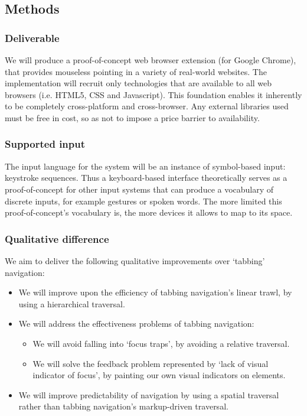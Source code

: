 \documentclass[11pt,openright,a4paper]{report}
\begin{document}
\subsection{Methods}
\subsubsection{Deliverable}
We will produce a proof-of-concept web browser extension (for Google Chrome), that provides mouseless pointing in a variety of real-world websites. The implementation will recruit only technologies that are available to all web browsers (i.e. HTML5, CSS and Javascript). This foundation enables it inherently to be completely cross-platform and cross-browser. Any external libraries used must be free in cost, so as not to impose a price barrier to availability.

\subsubsection{Supported input}
The input language for the system will be an instance of symbol-based input: keystroke sequences. Thus a keyboard-based interface theoretically serves as a proof-of-concept for other input systems that can produce a vocabulary of discrete inputs, for example gestures or spoken words. The more limited this proof-of-concept's vocabulary is, the more devices it allows to map to its space.

\subsubsection{Qualitative difference}
\label{sec:qualitative_promises}
We aim to deliver the following qualitative improvements over `tabbing' navigation:
\begin{itemize}
\item We will improve upon the efficiency of tabbing navigation's linear trawl, by using a hierarchical traversal.

\item We will address the effectiveness problems of tabbing navigation:
\begin{itemize}
\item We will avoid falling into `focus traps', by avoiding a relative traversal.
\item We will solve the feedback problem represented by `lack of visual indicator of focus', by painting our own visual indicators on elements.
\end{itemize}

\item We will improve predictability of navigation by using a spatial traversal rather than tabbing navigation's markup-driven traversal.
\end{itemize}
\end{document}
